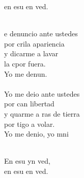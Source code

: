 \begin{cancion}
\begin{chorus}
	en esu en ved.\\
	\end{chorus}%
	\jump\\
	e denuncio ante ustedes \\
	por crila apariencia \\
	y dicarme a lavar \\
	la cpor fuera. \\
	Yo me denun. \\
\jump\\
	Yo me deio ante ustedes \\
	por can libertad \\
	y quarme a ras de tierra \\
	por tigo a volar. \\
	Yo me denio, yo mni\\\jump\\
	\begin{chorus}%
	En esu yn ved, \\
	en esu en ved.\\
	\end{chorus}%
	\jump\\
\end{cancion}%
